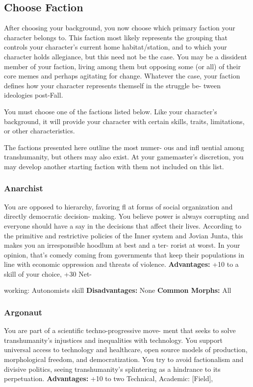 \subsection{Choose Faction}

After choosing your background, you now choose 
which primary faction your character belongs to. 
This faction most likely represents the grouping that 
controls your character's current home habitat/station, 
and to which your character holds allegiance, but this 
need not be the case. You may be a dissident member 
of your faction, living among them but opposing some 
(or all) of their core memes and perhaps agitating for 
change. Whatever the case, your faction defines how 
your character represents themself in the struggle be-
tween ideologies post-Fall.

You must choose one of the factions listed below. 
Like your character's background, it will provide your 
character with certain skills, traits, limitations, or 
other characteristics.

The factions presented here outline the most numer-
ous and infl uential among transhumanity, but others 
may also exist. At your gamemaster's discretion, you 
may develop another starting faction with them not 
included on this list.

\subsubsection{Anarchist}

You are opposed to hierarchy, favoring fl at forms of 
social organization and directly democratic decision-
making. You believe power is always corrupting and 
everyone should have a say in the decisions that affect 
their lives. According to the primitive and restrictive 
policies of the Inner system and Jovian Junta, this 
makes you an irresponsible hoodlum at best and a ter-
rorist at worst. In your opinion, that's comedy coming 
from governments that keep their populations in line 
with economic oppression and threats of violence.
\textbf{Advantages:} +10 to a skill of your choice, +30 Net-

working: Autonomists skill
\textbf{Disadvantages:} None
\textbf{Common Morphs:} All

\subsubsection{Argonaut}

You are part of a scientific techno-progressive move-
ment that seeks to solve transhumanity's injustices and 
inequalities with technology. You support universal 
access to technology and healthcare, open source 
models of production, morphological freedom, and 
democratization. You try to avoid factionalism and 
divisive politics, seeing transhumanity's splintering as 
a hindrance to its perpetuation.
\textbf{Advantages:} +10 to two Technical, Academic: [Field], 

